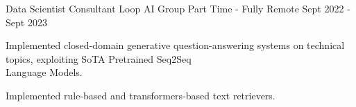 \begin{cventries}
    
    \cventry
    {Data Scientist Consultant} %
    {Loop AI Group} %
    {Part Time - Fully Remote} %
    {Sept 2022 - Sept 2023} %
    {
      \begin{cvitems} %
        \item {Implemented closed-domain generative question-answering systems on technical topics, exploiting SoTA Pretrained Seq2Seq \\Language Models.}
        \item {Implemented rule-based and transformers-based text retrievers.}
      \end{cvitems}
    } 
    \begin{comment}
    \cventry
    {Bartender} %
    {Chiosco il Tempio} %
    {Part Time - Florence, Italy} %
    {June 2017 - Sept 2022} %
    {
        \begin{cvitems} %
        \item {Managed inventory and organized events, improving customer engagement and operational efficiency.}
        \item {Led team scheduling and ensured high standards of service and compliance with safety regulations.}
        \item {\textbf{Soft Skills:} Public Relations Management, Communication, Time Management, Multitasking.}
    \end{cvitems}
    }
    \end{comment}


\end{cventries}
